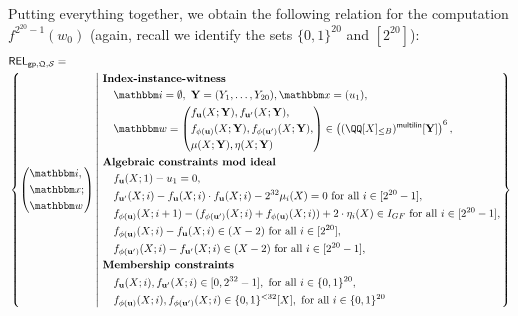 \documentclass[11pt,letterpaper,usenames,dvipsnames]{article}
\begin{document}
Putting everything together, we obtain the following relation for the computation $f^{2^{20}-1}(w_0)$ (again, recall we identify the sets $\{0,1\}^{20}$ and $[2^20]$):
   \begin{equation*}
    \begin{aligned}
    &\REL_{\gparams,\megaQ,\cS} =\\ &\left\{ \left(\begin{aligned}&\idx,\\ &\inp;\\ &\wit\end{aligned}\right) \left| \ \begin{aligned}
        &\textbf{Index-instance-witness}\\
    &\quad \idx = \emptyset, \ \YY=(Y_1,\ldots, Y_{20}), \inp =(u_1),\\    
        &\quad  \wit = \left(\begin{split}&f_{\uu}(X;\YY), f_{\uu'}(X;\YY),\\ &f_{\phi(\uu)}(X;\YY),  f_{\phi(\uu')}(X;\YY),\\ &\mu(X;\YY), \eta(X;\YY)\end{split}\right) \in \left(\mainQpolyringmultilin[\YY]\right)^{6},\\
        &\textbf{Algebraic constraints mod ideal}\\
        &\quad f_{\uu}(X;1)-u_1 = 0,\\
        &\quad f_{\uu'}(X; i) - f_{\uu}(X;i)\cdot f_{\uu}(X;i) - 2^{32} \mu_i(X) = 0 \text{ for all } i\in [2^{20}-1],\\
        &\quad f_{\phi(\uu)}(X; i+1) - (f_{\phi(\uu')}(X;i) + f_{\phi(\uu)}(X;i)) + 2\cdot \eta_i(X) \in I_{GF} \text{ for all } i\in [2^{20}-1],\\
        &\quad f_{\phi(\uu)}(X;i)-f_{\uu}(X;i) \in (X-2)\text{ for all } i\in [2^{20}],\\
        &\quad f_{\phi(\uu')}(X;i)-f_{\uu'}(X;i) \in (X-2)\text{ for all } i\in [2^{20}-1],\\
        &\textbf{Membership constraints}\\
        &\quad  f_{\uu}(X;i), f_{\uu'}(X;i) \in [0,2^{32}-1], \text{ for all } i \in \{0,1\}^{20},\\ 
        &\quad f_{\phi(\uu)}(X;i), f_{\phi(\uu')}(X;i) \in \{0,1\}^{<32}[X],  \text{ for all } i \in \{0,1\}^{20}
    \end{aligned} \right.\right\}
    \end{aligned}
    \end{equation*}
\end{document}
